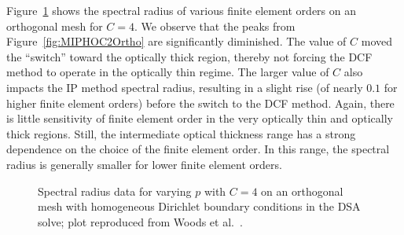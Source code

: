 \documentclass[12pt]{article}
\begin{document}
\FloatBarrier

Figure~\ref{fig:MIPHOC4Ortho} shows the spectral radius of various finite element orders on an orthogonal mesh for $C=4$. We observe that the peaks from Figure~\ref{fig:MIPHOC2Ortho} are significantly diminished. The value of $C$ moved the ``switch'' toward the optically thick region, thereby not forcing the DCF method to operate in the optically thin regime. The larger value of $C$ also impacts the IP method spectral radius, resulting in a slight rise (of nearly $0.1$ for higher finite element orders) before the switch to the DCF method. Again, there is little sensitivity of finite element order in the very optically thin and optically thick regions. Still, the intermediate optical thickness range has a strong dependence on the choice of the finite element order. In this range, the spectral radius is generally smaller for lower finite element orders.

\begin{figure}[!hbt]
\centering
{}
\caption{Spectral radius data for varying $p$ with $C=4$ on an orthogonal mesh with homogeneous Dirichlet boundary conditions in the DSA solve; plot reproduced from Woods et al.~\cite{WoodsDSA}.}
\label{fig:MIPHOC4Ortho}
\end{figure}
\end{document}
